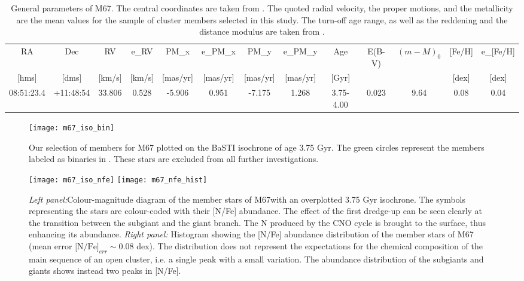 \documentclass[a4paper,fleqn,usenatbib]{mnras}
\begin{document}
\begin{table*}
	\caption{General parameters of M67. The central coordinates are taken from \citet{kharchenko2013}. The quoted radial velocity, the proper motions, and the metallicity are the mean values for the sample of cluster members selected in this study. The turn-off age range, as well as the reddening and the distance modulus are taken from \citet{bellini2010}.}
	\begin{tabular}{|c|c|c|c|c|c|c|c|c|c|c|c|c|}
		\hline
		\multicolumn{1}{c|}{RA} &
		\multicolumn{1}{c|}{Dec} &
		\multicolumn{1}{c|}{RV} &
		\multicolumn{1}{c|}{e\_RV} &
		\multicolumn{1}{c|}{PM\_x} &
		\multicolumn{1}{c|}{e\_PM\_x} &
		\multicolumn{1}{c|}{PM\_y} &
		\multicolumn{1}{c|}{e\_PM\_y} &
		\multicolumn{1}{c|}{Age} &
		\multicolumn{1}{c|}{E(B-V)} &
		\multicolumn{1}{c|}{$(m-M)_0$} &
		\multicolumn{1}{c|}{[Fe/H]}&
		\multicolumn{1}{c|}{e\_[Fe/H]}\\
		{[hms]}&{[dms]}&{[km/s]}&{[km/s]}&{[mas/yr]}&{[mas/yr]}&{[mas/yr]}&{[mas/yr]}&{[Gyr]}&{}&{}&{[dex]}&{[dex]}\\
		\hline
		08:51:23.4&+11:48:54&33.806&0.528&-5.906&0.951&-7.175&1.268&3.75-4.00&0.023&9.64&0.08&0.04\\
		\hline
		
	\end{tabular}
	\label{tab:cluster_par}
\end{table*}



\begin{figure}
	\texttt{[image: m67\_iso\_bin]}
	\caption{Our selection of members for M67 plotted on the BaSTI isochrone of age 3.75 Gyr. The green circles represent the members labeled as binaries 
in \citet{geller2015}. These stars are excluded from all further investigations.}
	\label{fig:cmd_bin}
\end{figure}

\begin{figure*}
	\texttt{[image: m67\_iso\_nfe]}
	\texttt{[image: m67\_nfe\_hist]}
	\caption{\textit{Left panel:}Colour-magnitude diagram of the member stars of M67with an overplotted 3.75 Gyr isochrone. The symbols representing the stars are colour-coded with their [N/Fe] abundance. The effect of the first dredge-up can be seen clearly at the transition between the subgiant and the giant branch. The N produced by the CNO cycle is brought to the surface, thus enhancing its abundance. \textit{Right panel:} Histogram showing the [N/Fe] abundance distribution of the member stars of M67 (mean error $\text{[N/Fe]}_{err}\sim0.08$ dex). The distribution does not represent the expectations for the chemical composition of the main sequence of an open cluster, i.e. a single peak with a small variation. The abundance distribution of the subgiants and giants shows instead two	peaks in [N/Fe].}	
	\label{fig:ab_iso_nfe}
\end{figure*}
\end{document}
